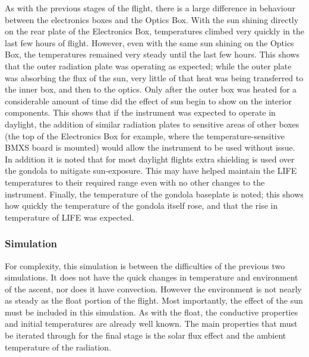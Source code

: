 As with the previous stages of the flight, there is a large difference in behaviour between the electronics boxes and the Optics Box. With the sun shining directly on the rear plate of the Electronics Box, temperatures climbed very quickly in the last few hours of flight. However, even with the same sun shining on the Optics Box, the temperatures remained very steady until the last few hours. This shows that the outer radiation plate was operating as expected; while the outer plate was absorbing the flux of the sun, very little of that heat was being transferred to the inner box, and then to the optics. Only after the outer box was heated for a considerable amount of time did the effect of sun begin to show on the interior components. This shows that if the instrument was expected to operate in daylight, the addition of similar radiation plates to sensitive areas of other boxes (the top of the Electronics Box for example, where the temperature-sensitive BMXS board is mounted) would allow the instrument to be used without issue. In addition it is noted that for most daylight flights extra shielding is used over the gondola to mitigate sun-exposure. This may have helped maintain the LIFE temperatures to their required range even with no other changes to the instrument. Finally, the temperature of the gondola baseplate is noted; this shows how quickly the temperature of the gondola itself rose, and that the rise in temperature of LIFE was expected.

\subsubsection{Simulation}
For complexity, this simulation is between the difficulties of the previous two simulations. It does not have the quick changes in temperature and environment of the ascent, nor does it have convection. However the environment is not nearly as steady as the float portion of the flight. Most importantly, the effect of the sun must be included in this simulation. As with the float, the conductive properties and initial temperatures are already well known. The main properties that must be iterated through for the final stage is the solar flux effect and the ambient temperature of the radiation.

